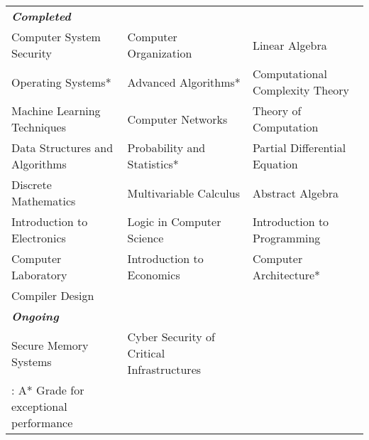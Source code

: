\documentclass[12pt, a4paper]{awesome-cv}
\begin{document}
{\fontsize{11pt}{1em}\bodyfontlight\upshape\color{text}
\begin{tabular}{l l l}
\textbf{\textit{Completed}}\\
 Computer System Security & Computer Organization & Linear Algebra\\ 
 Operating Systems* & Advanced Algorithms* & Computational Complexity Theory\\
 Machine Learning Techniques & Computer Networks & Theory of Computation\\
 Data Structures and Algorithms & Probability and Statistics* & Partial Differential Equation\\
 Discrete Mathematics  & Multivariable Calculus & Abstract Algebra\\
 Introduction to Electronics & Logic in Computer Science & Introduction to Programming \\
 Computer Laboratory & Introduction to Economics & Computer Architecture*\\
 Compiler Design\\
 
\textbf{\textit{Ongoing}}\\
 Secure Memory Systems & Cyber Security of Critical Infrastructures\\

 {\footnotesize  * : A* Grade for exceptional performance}\\
 \end{tabular}
 }
\vspace{-0.3cm}
\end{document}
